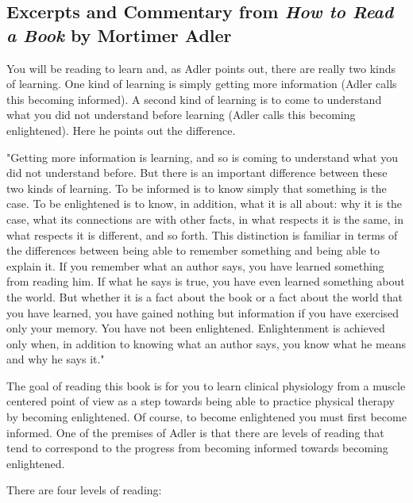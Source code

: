 

\subsection{Excerpts and Commentary from \textit{How to Read a Book} by Mortimer Adler}

You will be reading to learn and, as Adler points out, there are really two kinds of learning. One kind of learning is simply getting more information (Adler calls this becoming informed). A second kind of learning is to come to understand what you did not understand before learning (Adler calls this becoming enlightened). Here he points out the difference.
\begin{displayquote}
"Getting more information is learning, and so is coming to understand what you did not understand before. But there is an important difference between these two kinds of learning. To be informed is to know simply that something is the case. To be enlightened is to know, in addition, what it is all about: why it is the case, what its connections are with other facts, in what respects it is the same, in what respects it is different, and so forth. This distinction is familiar in terms of the differences between being able to remember something and being able to explain it. If you remember what an author says, you have learned something from reading him. If what he says is true, you have even learned something about the world. But whether it is a fact about the book or a fact about the world that you have learned, you have gained nothing but information if you have exercised only your memory. You have not been enlightened. Enlightenment is achieved only when, in addition to knowing what an author says, you know what he means and why he says it."\cite{adler_how_1942}
\end{displayquote}


The goal of reading this book is for you to learn clinical physiology from a muscle centered point of view as a step towards being able to practice physical therapy by becoming enlightened. Of course, to become enlightened you must first become informed. One of the premises of Adler is that there are levels of reading that tend to correspond to the progress from becoming informed towards becoming enlightened. 
\vspace{0.2in}
\begin{flushleft}
There are four levels of reading:     
\end{flushleft}

